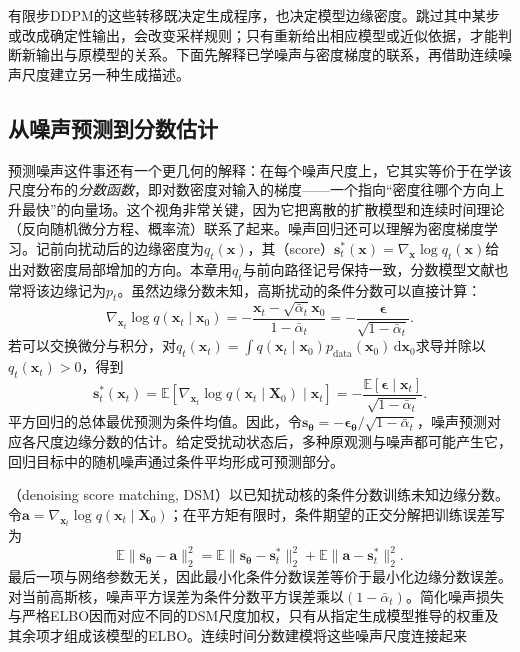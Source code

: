 有限步DDPM的这些转移既决定生成程序，也决定模型边缘密度。跳过其中某步或改成确定性输出，会改变采样规则；只有重新给出相应模型或近似依据，才能判断新输出与原模型的关系。下面先解释已学噪声与密度梯度的联系，再借助连续噪声尺度建立另一种生成描述。

\subsection{从噪声预测到分数估计}
\label{sec:pgm-generative-score-estimation}

预测噪声这件事还有一个更几何的解释：在每个噪声尺度上，它其实等价于在学该尺度分布的\emph{分数函数}，即对数密度对输入的梯度——一个指向“密度往哪个方向上升最快”的向量场。这个视角非常关键，因为它把离散的扩散模型和连续时间理论（反向随机微分方程、概率流）联系了起来。噪声回归还可以理解为密度梯度学习。记前向扰动后的边缘密度为$q_t(\bm{x})$，其（score）$\bm{s}_t^*(\bm{x})=\nabla_{\bm{x}}\log q_t(\bm{x})$给出对数密度局部增加的方向。本章用$q_t$与前向路径记号保持一致，分数模型文献也常将该边缘记为$p_t$。虽然边缘分数未知，高斯扰动的条件分数可以直接计算：
\[
  \nabla_{\bm{x}_t}\log q(\bm{x}_t\mid\bm{x}_0)
  =-\frac{\bm{x}_t-\sqrt{\bar{\alpha}_t}\bm{x}_0}
           {1-\bar{\alpha}_t}
  =-\frac{\bm{\epsilon}}{\sqrt{1-\bar{\alpha}_t}}.
\]
若可以交换微分与积分，对$q_t(\bm{x}_t)=\int q(\bm{x}_t\mid\bm{x}_0)p_{\mathrm{data}}(\bm{x}_0)\,\mathrm{d}\bm{x}_0$求导并除以$q_t(\bm{x}_t)>0$，得到
\begin{equation}
  \label{eq:pgm-generative-denoising-identity}
  \bm{s}_t^*(\bm{x}_t)
  =\mathbb{E}\!\left[
       \nabla_{\bm{x}_t}\log q(\bm{x}_t\mid\bm{X}_0)
       \mid\bm{x}_t\right]
  =-\frac{\mathbb{E}[\bm{\epsilon}\mid\bm{x}_t]}
            {\sqrt{1-\bar{\alpha}_t}}.
\end{equation}
平方回归的总体最优预测为条件均值。因此，令$\bm{s}_{\bm{\theta}}=-\bm{\epsilon}_{\bm{\theta}}/\sqrt{1-\bar{\alpha}_t}$，噪声预测对应各尺度边缘分数的估计。给定受扰动状态后，多种原观测与噪声都可能产生它，回归目标中的随机噪声通过条件平均形成可预测部分。

（denoising score matching, DSM）以已知扰动核的条件分数训练未知边缘分数。令$\bm{a}=\nabla_{\bm{x}_t}\log q(\bm{x}_t\mid\bm{X}_0)$；在平方矩有限时，条件期望的正交分解把训练误差写为
\begin{equation}
  \label{eq:pgm-generative-dsm-decomposition}
  \mathbb{E}\lVert\bm{s}_{\bm{\theta}}-\bm{a}\rVert_2^2
  =\mathbb{E}\lVert\bm{s}_{\bm{\theta}}-\bm{s}_t^*\rVert_2^2
   +\mathbb{E}\lVert\bm{a}-\bm{s}_t^*\rVert_2^2.
\end{equation}
最后一项与网络参数无关，因此最小化条件分数误差等价于最小化边缘分数误差。对当前高斯核，噪声平方误差为条件分数平方误差乘以$(1-\bar{\alpha}_t)$。简化噪声损失与严格ELBO因而对应不同的DSM尺度加权，只有从指定生成模型推导的权重及其余项才组成该模型的ELBO。连续时间分数建模将这些噪声尺度连接起来

